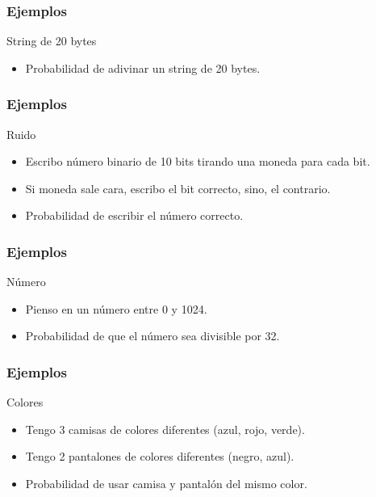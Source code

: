 \documentclass[table]{beamer}
\begin{document}
\begin{frame}
    \frametitle{Ejemplos}
    \begin{block}{String de 20 bytes}
        \begin{itemize}
            \item Probabilidad de adivinar un string de 20 bytes.
        \end{itemize}
    \end{block}
\end{frame}

\begin{frame}
    \frametitle{Ejemplos}
    \begin{block}{Ruido}
        \begin{itemize}
            \item Escribo número binario de 10 bits tirando una moneda para cada bit.
            \item Si moneda sale cara, escribo el bit correcto, sino, el contrario.
            \item Probabilidad de escribir el número correcto.
        \end{itemize}
    \end{block}
\end{frame}

\begin{frame}
    \frametitle{Ejemplos}
    \begin{block}{Número}
        \begin{itemize}
            \item Pienso en un número entre 0 y 1024.
            \item Probabilidad de que el número sea divisible por 32.
        \end{itemize}
    \end{block}
\end{frame}

\begin{frame}
    \frametitle{Ejemplos}
    \begin{block}{Colores}
        \begin{itemize}
            \item Tengo 3 camisas de colores diferentes (azul, rojo, verde).
            \item Tengo 2 pantalones de colores diferentes (negro, azul).
            \item Probabilidad de usar camisa y pantalón del mismo color.
        \end{itemize}
    \end{block}
\end{frame}
\end{document}
